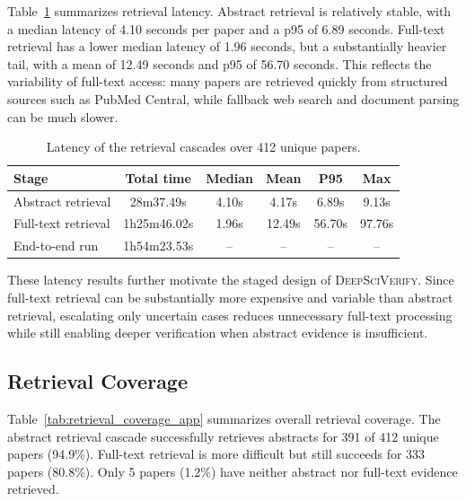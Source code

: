 \documentclass{article}
\theoremstyle{plain}
\theoremstyle{definition}
\theoremstyle{remark}
\begin{document}
Table~\ref{tab:retrieval_latency_app} summarizes retrieval latency. Abstract retrieval is relatively stable, with a median latency of 4.10 seconds per paper and a p95 of 6.89 seconds. Full-text retrieval has a lower median latency of 1.96 seconds, but a substantially heavier tail, with a mean of 12.49 seconds and p95 of 56.70 seconds. This reflects the variability of full-text access: many papers are retrieved quickly from structured sources such as PubMed Central, while fallback web search and document parsing can be much slower.


\begin{table}[htb]
\centering
\small
\caption{Latency of the retrieval cascades over 412 unique papers.}
\label{tab:retrieval_latency_app}

\begin{tabularx}{\textwidth}{>{\raggedright\arraybackslash}Xccccc}
\toprule
\textbf{Stage} & \textbf{Total time} & \textbf{Median} & \textbf{Mean} & \textbf{P95} & \textbf{Max} \\
\midrule
Abstract retrieval  & 28m37.49s  & 4.10s & 4.17s  & 6.89s  & 9.13s \\
Full-text retrieval & 1h25m46.02s & 1.96s & 12.49s & 56.70s & 97.76s \\
\midrule
End-to-end run      & 1h54m23.53s & -- & -- & -- & -- \\
\bottomrule
\end{tabularx}

\end{table}

These latency results further motivate the staged design of \textsc{DeepSciVerify}. Since full-text retrieval can be substantially more expensive and variable than abstract retrieval, escalating only uncertain cases reduces unnecessary full-text processing while still enabling deeper verification when abstract evidence is insufficient.

\subsection{Retrieval Coverage}
\label{app:retrieval_coverage}

Table~\ref{tab:retrieval_coverage_app} summarizes overall retrieval coverage. The abstract retrieval cascade successfully retrieves abstracts for 391 of 412 unique papers (94.9\%). Full-text retrieval is more difficult but still succeeds for 333 papers (80.8\%). Only 5 papers (1.2\%) have neither abstract nor full-text evidence retrieved.
\end{document}
